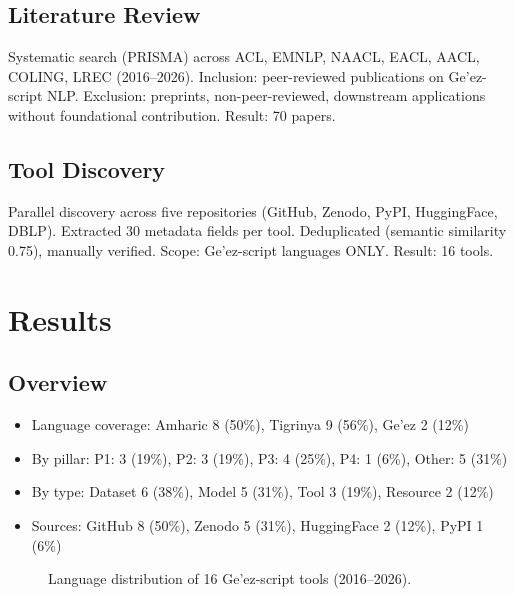 \documentclass[12pt,a4paper]{article}
\theoremstyle{plain}
\theoremstyle{definition}
\begin{document}
\subsection{Literature Review}
Systematic search (PRISMA) across ACL, EMNLP, NAACL, EACL, AACL, COLING, LREC (2016--2026). Inclusion: peer-reviewed publications on Ge'ez-script NLP. Exclusion: preprints, non-peer-reviewed, downstream applications without foundational contribution. Result: 70 papers.

\subsection{Tool Discovery}
Parallel discovery across five repositories (GitHub, Zenodo, PyPI, HuggingFace, DBLP). Extracted 30 metadata fields per tool. Deduplicated (semantic similarity 0.75), manually verified. Scope: Ge'ez-script languages ONLY. Result: 16 tools.

\section{Results}

\subsection{Overview}
\begin{itemize}
    \item Language coverage: Amharic 8 (50\%), Tigrinya 9 (56\%), Ge'ez 2 (12\%)
    \item By pillar: P1: 3 (19\%), P2: 3 (19\%), P3: 4 (25\%), P4: 1 (6\%), Other: 5 (31\%)
    \item By type: Dataset 6 (38\%), Model 5 (31\%), Tool 3 (19\%), Resource 2 (12\%)
    \item Sources: GitHub 8 (50\%), Zenodo 5 (31\%), HuggingFace 2 (12\%), PyPI 1 (6\%)
\end{itemize}

\begin{figure}[ht]
\centering
{}
\caption{Language distribution of 16 Ge'ez-script tools (2016--2026).}
\label{fig:language}
\end{figure}
\end{document}
